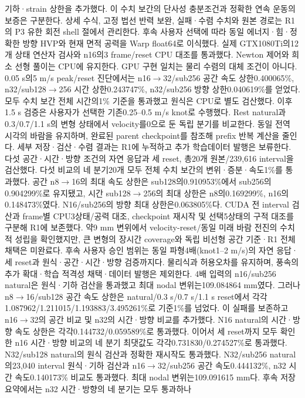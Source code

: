 \documentclass[11pt]{article}
\begin{document}
기하·strain 상한을 추가했다. 이 수치 보간의 단사성 충분조건과 정확한 연속 운동의 보증은 구분한다.
상세 수식, 고정 법선 반력 보완, 실패·수렴 수치와 원본 경로는 R1의 P3 유한 회전 shell 절에서 관리한다.
후속 사용자 선택에 따라 동일 에너지·힘·정확한 방향 HVP와 현재 면적 공력을 Warp float64로 이식했다.
실제 GTX1080Ti의12개 상태 연산자 검사와 n16의3 frame/reset CPU 대조를 통과했다.
Newton 제어와 희소 선형 풀이는 CPU에 유지한다. GPU 구현 일치는 물리 수렴의 대체 조건이 아니다.
0.05 s의5 m/s peak/reset 진단에서는 n16$\to$32/sub256 공간 속도 상한0.400065\%,
n32/sub128$\to$256 시간 상한0.243747\%, n32/sub256 방향 상한0.040619\%를 얻었다.
모두 수치 보간 전체 시간의1\% 기준을 통과했고 원식은 CPU로 별도 검산했다.
이후1.5 s 검증은 사용자가 선택한 기존0.25--0.5 m/s knot로 수행했다.
Rest natural과0.3/0.7/1.1 s의 변형 상태에서 velocity를0으로 둔 독립 분기를 비교한다.
동일 전역 시각의 바람을 유지하며, 완료된 parent checkpoint를 참조해 prefix 반복 계산을 줄인다.
세부 저장·검산·수렴 결과는 R1에 누적하고 추가 학습데이터 발행은 보류한다.
다섯 공간·시간·방향 조건의 자연 응답과 세 reset, 총20개 원본/239,616 interval을 검산했다.
다섯 비교의 네 분기20개 모두 전체 수치 보간의 변위·증분·속도1\%를 통과했다.
공간 n8$\to$16의 최대 속도 상한은 sub128의0.910953\%에서 sub256의0.904299\%로 유지됐고,
시간 sub128$\to$256의 최대 상한은 n8의0.169299\%, n16의0.148473\%였다.
N16/sub256의 방향 최대 상한은0.063805\%다.
CUDA 전 interval 검산과 frame별 CPU3상태/공력 대조, checkpoint 재시작 및 선택5상태의 구적 대조를
구분해 R1에 보존했다. 약9 mm 변위에서 velocity-reset/동일 미래 바람 전진의 수치적 성립을 확인했지만,
큰 변형의 장시간 coverage와 독립 비선형 공간 기준·R1 전체 채택은 미완료다.
후속 사용자 승인 범위는 동일 파형4배(knot1--2 m/s)의 자연 응답·세 reset과 원식·공간·시간·방향
검증까지다. 물리식과 허용오차를 유지하며, 풍속의 추가 확대·학습 적격성 채택·데이터 발행은 제외한다.
4배 입력의 n16/sub256 natural은 원식·기하 검산을 통과했고 최대 nodal 변위는109.084864 mm였다.
그러나 n8$\to$16/sub128 공간 속도 상한은 natural/0.3 s/0.7 s/1.1 s reset에서 각각
1.087962/1.211015/1.193883/3.495261\%로 기준1\%를 넘었다. 이 실패를 보존하고 n16$\to$32의
공간 비교 및 n32의 시간·방향 비교를 추가했다. N16 natural의 시간·방향 속도 상한은
각각0.144732/0.059589\%로 통과했다. 이어서 세 reset까지 모두 확인한 n16 시간·방향 비교의
네 분기 최댓값도 각각0.731830/0.274527\%로 통과했다. N32/sub128 natural의 원식 검산과
정확한 재시작도 통과했다. N32/sub256 natural의23,040 interval 원식·기하 검산과
n16$\to$32/sub256 공간 속도0.444132\%, n32 시간 속도0.140173\% 비교도 통과했다.
최대 nodal 변위는109.091615 mm다. 후속 저장 요약에서는 n32 시간·방향의 네 분기는 모두 통과하나
\end{document}
